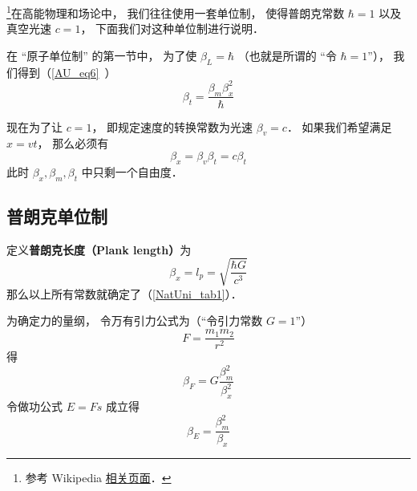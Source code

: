 
\begin{issues}
\issueDraft
\end{issues}


\footnote{参考 Wikipedia \href{https://en.wikipedia.org/wiki/Natural_units}{相关页面}．}在高能物理和场论中， 我们往往使用一套单位制， 使得普朗克常数 $\hbar = 1$ 以及真空光速 $c = 1$， 下面我们对这种单位制进行说明．

在 “原子单位制” 的第一节中， 为了使 $\beta_L = \hbar$ （也就是所谓的 “令 $\hbar = 1$”）， 我们得到（\autoref{AU_eq6}~）
\begin{equation}\label{NatUni_eq1}
\beta_t = \frac{\beta_m \beta_x^2}{\hbar}
\end{equation}

现在为了让 $c = 1$， 即规定速度的转换常数为光速 $\beta_v = c$． 如果我们希望满足 $x = vt$， 那么必须有
\begin{equation}
\beta_x = \beta_v \beta _t = c\beta_t
\end{equation}
此时 $\beta_x, \beta_m, \beta_t$ 中只剩一个自由度．

\subsection{普朗克单位制}
定义\textbf{普朗克长度（Plank length）}为
\begin{equation}
\beta_x = l_p = \sqrt{\frac{\hbar G}{c^3}}
\end{equation}
那么以上所有常数就确定了（\autoref{NatUni_tab1}）．

为确定力的量纲， 令万有引力公式为（“令引力常数 $G = 1$”）
\begin{equation}
F = \frac{m_1 m_2}{r^2}
\end{equation}
得
\begin{equation}
\beta_F = G\frac{\beta_m^2}{\beta_x^2}
\end{equation}
令做功公式 $E = Fs$ 成立得
\begin{equation}
\beta_E = \frac{\beta_m^2}{\beta_x}
\end{equation}





